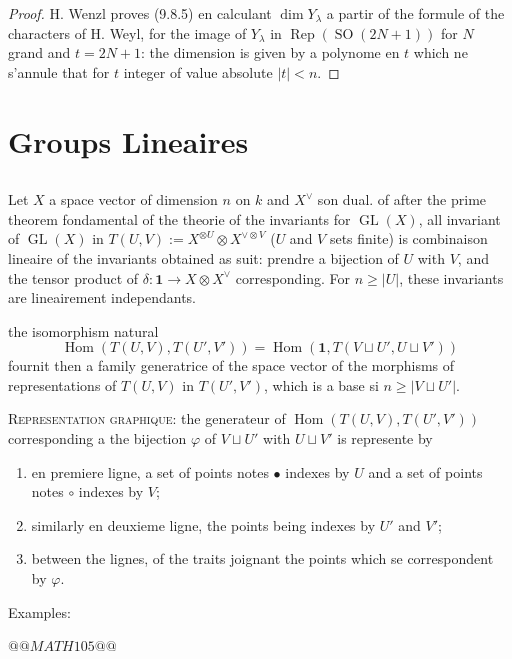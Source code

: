\documentclass[11pt,a4paper]{article}
\theoremstyle{plain}
\theoremstyle{definition}
\DeclareMathOperator{\Hom}{Hom}
\DeclareMathOperator{\Rep}{Rep}
\DeclareMathOperator{\GL}{GL}
\DeclareMathOperator{\SO}{SO}
\begin{document}
\begin{proof}
H. Wenzl proves (9.8.5) en calculant $\dim Y_\lambda$ a partir of the formule of the characters of H. Weyl, for the image of $Y_\lambda$ in $\Rep(\SO(2N+1))$ for $N$ grand and $t = 2N + 1$: the dimension is given by a polynome en $t$ which ne s'annule that for $t$ integer of value absolute $|t| < n$.
\end{proof}


\section{Groups Lineaires}

\subsection{}
Let $X$ a space vector of dimension $n$ on $k$ and $X^\vee$ son dual. of after the prime theorem fondamental of the theorie of the invariants for $\GL(X)$, all invariant of $\GL(X)$ in $T(U, V) := X^{\otimes U} \otimes X^{\vee \otimes V}$ ($U$ and $V$ sets finite) is combinaison lineaire of the invariants obtained as suit: prendre a bijection of $U$ with $V$, and the tensor product of $\delta : \mathbf{1} \to X \otimes X^\vee$ corresponding. For $n \geq |U|$, these invariants are lineairement independants.

the isomorphism natural
\begin{equation}
\Hom(T(U, V), T(U', V')) = \Hom(\mathbf{1}, T(V \sqcup U', U \sqcup V')) \tag{10.1.1}
\end{equation}
fournit then a family generatrice of the space vector of the morphisms of representations of $T(U, V)$ in $T(U', V')$, which is a base si $n \geq |V \sqcup U'|$.

\textsc{Representation graphique}: the generateur of $\Hom(T(U, V), T(U', V'))$ corresponding a the bijection $\varphi$ of $V \sqcup U'$ with $U \sqcup V'$ is represente by
\begin{enumerate}[label=\alph*)]
\item en premiere ligne, a set of points notes $\bullet$ indexes by $U$ and a set of points notes $\circ$ indexes by $V$;
\item similarly en deuxieme ligne, the points being indexes by $U'$ and $V'$;
\item between the lignes, of the traits joignant the points which se correspondent by $\varphi$.
\end{enumerate}

Examples:

\begin{center}
$@@MATH105@@$
\end{center}
\end{document}
